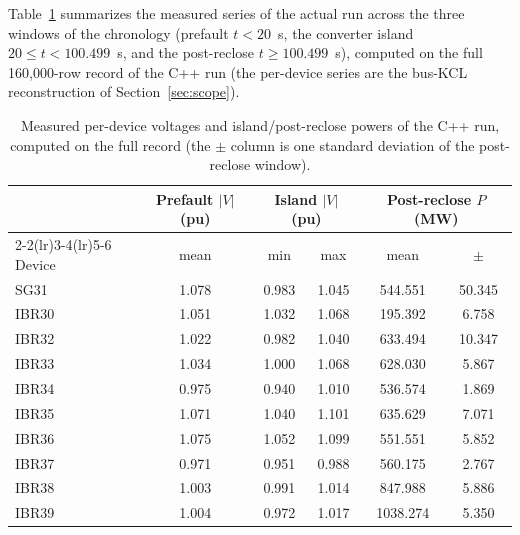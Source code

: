 \documentclass[12pt,a4paper]{article}
\begin{document}
Table~\ref{tab:tsstats} summarizes the measured series of the actual run
across the three windows of the chronology (prefault $t<20$~s, the
converter island $20\le t<100.499$~s, and the post-reclose
$t\ge100.499$~s), computed on the full 160{,}000-row record of the C++ run
(the per-device series are the bus-KCL reconstruction of Section~\ref{sec:scope}).

\begin{table}[H]\centering\footnotesize
\caption{Measured per-device voltages and island/post-reclose powers of the
C++ run, computed on the full record (the $\pm$ column is one standard
deviation of the post-reclose window).}
\label{tab:tsstats}
\begin{tabular}{lccccc}
\toprule
& \multicolumn{1}{c}{Prefault $|V|$ (pu)} &
\multicolumn{2}{c}{Island $|V|$ (pu)} &
\multicolumn{2}{c}{Post-reclose $P$ (MW)}\\
\cmidrule(lr){2-2}\cmidrule(lr){3-4}\cmidrule(lr){5-6}
Device & mean & min & max & mean & $\pm$\\
\midrule
SG31   & 1.078 & 0.983 & 1.045 & 544.551 & 50.345\\
IBR30  & 1.051 & 1.032 & 1.068 & 195.392 & 6.758\\
IBR32  & 1.022 & 0.982 & 1.040 & 633.494 & 10.347\\
IBR33  & 1.034 & 1.000 & 1.068 & 628.030 & 5.867\\
IBR34  & 0.975 & 0.940 & 1.010 & 536.574 & 1.869\\
IBR35  & 1.071 & 1.040 & 1.101 & 635.629 & 7.071\\
IBR36  & 1.075 & 1.052 & 1.099 & 551.551 & 5.852\\
IBR37  & 0.971 & 0.951 & 0.988 & 560.175 & 2.767\\
IBR38  & 1.003 & 0.991 & 1.014 & 847.988 & 5.886\\
IBR39  & 1.004 & 0.972 & 1.017 & 1038.274 & 5.350\\
\bottomrule
\end{tabular}
\end{table}
\end{document}
